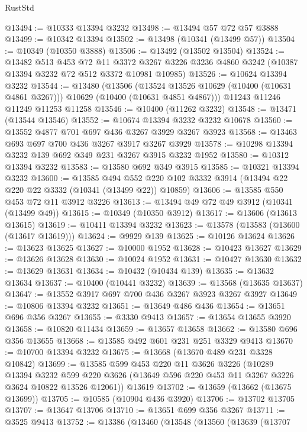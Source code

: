 \begin{lexlean}{RustStd}
\begin{coremodule}
@13494 := @10333 @13394 @3232
@13498 := @13494 @57 @72 @57 @3888
@13499 := @10342 @13394
@13502 := @13498 (@10341 (@13499 @57))
@13504 := @10349 (@10350 @3888)
@13506 := @13492 (@13502 @13504)
@13524 := @13482
    @513
    @453
    @72
    @11
    @3372
    @3267
    @3226
    @3236
    @4860
    @3242
    (@10387 @13394 @3232 @72 @512 @3372 @10981 @10985)
@13526 := @10624 @13394 @3232
@13544 := @13480
    (@13506
      (@13524 @13526 @10629 (@10400 (@10631 @4861 @3267)))
      @10629
      (@10400 (@10631 @4851 @4867)))
    @11243
    @11246
    @11249
    @11253
    @11258
@13546 := @10400 (@11262 @3232)
@13548 := @13471 (@13544 @13546)
@13552 := @10674 @13394 @3232 @3232 @10678
@13560 := @13552 @4877 @701 @697 @436 @3267 @3929 @3267 @3923
@13568 := @13463 @693 @697 @700 @436 @3267 @3917 @3267 @3929
@13578 := @10298 @13394 @3232 @139 @692 @349 @231 @3267 @3915 @3232 @1952
@13580 := @10312 @13394 @3232
@13583 := @13580 @692 @349 @3915
@13585 := @10321 @13394 @3232
@13600 := @13585
    @494
    @552
    @220
    @102
    @3332
    @3914
    (@13494 @22 @220 @22 @3332 (@10341 (@13499 @22)) @10859)
@13606 := @13585 @550 @453 @72 @11 @3912 @3226
@13613 := @13494 @49 @72 @49 @3912 (@10341 (@13499 @49))
@13615 := @10349 (@10350 @3912)
@13617 := @13606 (@13613 @13615)
@13619 := @10411 @13394 @3232
@13623 := @13578 (@13583 (@13600 (@13617 @13619)))
@13624 := @9929 @139
@13625 := @10126 @13624
@13626 := @13623 @13625
@13627 := @10000 @1952
@13628 := @10423 @13627
@13629 := @13626 @13628
@13630 := @10024 @1952
@13631 := @10427 @13630
@13632 := @13629 @13631
@13634 := @10432 (@10434 @139)
@13635 := @13632 @13634
@13637 := @10400 (@10441 @3232)
@13639 := @13568 (@13635 @13637)
@13647 := @13552 @3917 @697 @700 @436 @3267 @3923 @3267 @3927
@13649 := @10806 @13394 @3232
@13651 := @13649 @486 @436
@13654 := @13651 @696 @356 @3267
@13655 := @3330 @9413
@13657 := @13654 @13655 @3920
@13658 := @10820 @11434
@13659 := @13657 @13658
@13662 := @13580 @696 @356 @13655
@13668 := @13585 @492 @601 @231 @251 @3329 @9413
@13670 := @10700 @13394 @3232
@13675 := @13668 (@13670 @489 @231 @3328 @10842)
@13699 := @13585
    @599
    @453
    @220
    @11
    @3626
    @3226
    (@10289
      @13394
      @3232
      @599
      @220
      @3626
      (@13649 @596 @220 @453 @11 @3267 @3226 @3624 @10822 @13526 @12061))
    @13619
@13702 := @13659 (@13662 (@13675 @13699))
@13705 := @10585 (@10904 @436 @3920)
@13706 := @13702 @13705
@13707 := @13647 @13706
@13710 := @13651 @699 @356 @3267
@13711 := @3525 @9413
@13752 := @13386
    (@13460
      (@13548
        (@13560
          (@13639
            (@13707

\end{coremodule}
\end{lexlean}
